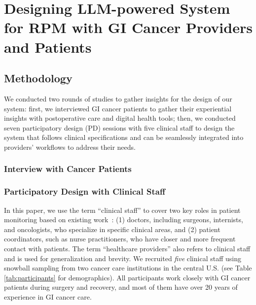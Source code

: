 
\section{Designing LLM-powered System for RPM with GI Cancer Providers and Patients}
\label{sec:3-participatory-design}
\subsection{Methodology}

We conducted two rounds of studies to gather insights for the design of our system: first, we interviewed GI cancer patients to gather their experiential insights with postoperative care and digital health tools; then, we conducted seven participatory design (PD) sessions with five clinical staff to design the system that follows clinical specifications and can be seamlessly integrated into providers' workflows to address their needs.




\subsubsection{Interview with Cancer Patients}




\subsubsection{Participatory Design with Clinical Staff}
\label{sub:3-pd-methods-provider}
In this paper, we use the term ``clinical staff'' to cover two key roles in patient monitoring based on existing work~\cite{leon2022impact}: (1) doctors, including surgeons, internists, and oncologists, who specialize in specific clinical areas, and (2) patient coordinators, such as nurse practitioners, who have closer and more frequent contact with patients. The term ``healthcare providers'' also refers to clinical staff and is used for generalization and brevity.
We recruited \textit{five} clinical staff using snowball sampling from two cancer care institutions in the central U.S. (see Table \ref{tab:participants} for demographics). 
All participants work closely with GI cancer patients during surgery and recovery, and most of them have over 20 years of experience in GI cancer care.

